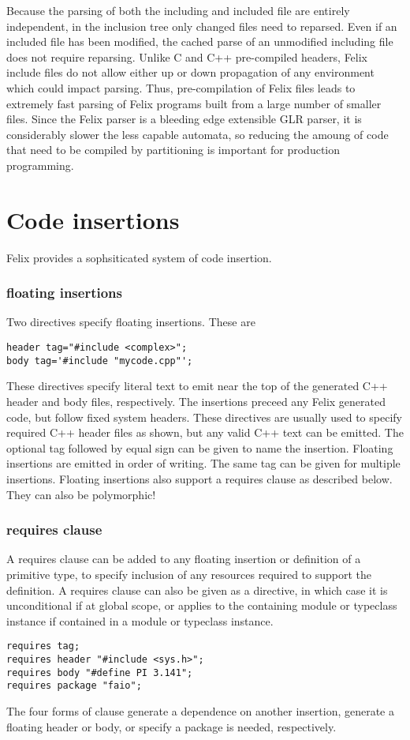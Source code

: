 \documentclass{report}
\begin{document}
Because the parsing of both the including and included file are
entirely independent, in the inclusion tree only changed files
need to reparsed. Even if an included file has been
modified, the cached parse of an unmodified including file
does not require reparsing. Unlike C and C++ pre-compiled headers,
Felix include files do not allow either up or down propagation
of any environment which could impact parsing. Thus, pre-compilation
of Felix files leads to extremely fast parsing of Felix programs
built from a large number of smaller files. Since the Felix parser
is a bleeding edge extensible GLR parser, it is considerably slower
the less capable automata, so reducing the amoung of code that
need to be compiled by partitioning is important for production
programming.

\chapter{Code insertions}
Felix provides a sophsiticated system of code insertion.
\subsection{floating insertions}
Two directives specify floating insertions. These are
\begin{verbatim}
header tag="#include <complex>";
body tag='#include "mycode.cpp"';
\end{verbatim}
%
These directives specify literal text to emit near the top
of the generated C++ header and body files, respectively.
The insertions preceed any Felix generated code, but follow
fixed system headers. These directives are usually used to 
specify required C++ header files as shown, but any valid
C++ text can be emitted. The optional tag followed by equal sign
can be given to name the insertion. 
%
Floating insertions are emitted in order of writing. The same tag
can be given for multiple insertions.
%
Floating insertions also support a requires clause as described below.
They can also be polymorphic!

\subsection{requires clause}
A requires clause can be added to any floating insertion or
definition of a primitive type, to specify inclusion of any
resources required to support the definition. A requires clause
can also be given as a directive, in which case it is unconditional
if at global scope, or applies to the containing module or typeclass
instance if contained in a module or typeclass instance.
\begin{verbatim}
requires tag;
requires header "#include <sys.h>";
requires body "#define PI 3.141";
requires package "faio";
\end{verbatim}
The four forms of clause generate a dependence on another
insertion, generate a floating header or body, or specify
a package is needed, respectively.
\end{document}
